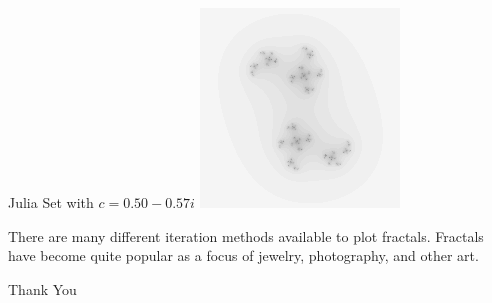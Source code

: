 \documentclass{beamer}
\begin{document}
\begin{center}
\begin{frame}
Julia Set with $c = 0.50 - 0.57i$
\includegraphics{Julia8}
\end{frame}

\begin{frame}
There are many different iteration methods available to plot fractals. Fractals have become quite popular as a focus of jewelry, photography, and other art.
\end{frame}

\begin{frame}
Thank You
\end{frame}

\end{center}
\end{document}
